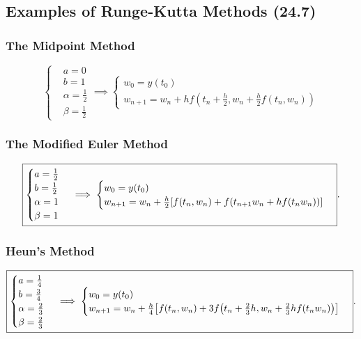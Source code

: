 \documentclass[12pt]{article}
\begin{document}
\subsection{Examples of Runge-Kutta Methods (24.7)}
\subsubsection{The Midpoint Method}
\begin{equation*}
  \boxed{\begin{cases}
     & a = 0\\
     & b=1\\
     & \alpha = \frac{1}{2}\\
     & \beta = \frac{1}{2}
    \end{cases}
    \implies 
    \begin{cases}
      w_0 = y(t_0) \\
      w_{n+1} = w_n + h f(t_n + \frac{h}{2}, w_n + \frac{h}{2}f(t_n, w_n)) 
  \end{cases}}
\end{equation*}
\subsubsection{The Modified Euler Method}
\begin{equation*}
  \boxed{\begin{cases}
      a = \frac{1}{2} \\
      b = \frac{1}{2} \\
      \alpha = 1 \\
      \beta = 1
    \end{cases}
    \implies 
    \begin{cases}
      w_0 = y(t_0) \\
      w_{n+1} = w_n + \frac{h}{2} \bqty{f(t_n,w_n)+f\pqty{t_{n+1}w_n+hf(t_nw_n)}}
  \end{cases}}
.\end{equation*}

\subsubsection{Heun's Method}
\begin{equation*}
  \boxed{\begin{cases}
      a = \frac{1}{4} \\
      b = \frac{3}{4} \\
      \alpha = \frac{2}{3} \\
      \beta = \frac{2}{3}
    \end{cases}
    \implies 
    \begin{cases}
      w_0 = y(t_0) \\
      w_{n+1} = w_n + \frac{h}{4} \bqty{f(t_n,w_n)+3f\pqty{t_n+\frac{2}{3}h,
      w_n+\frac{2}{3}hf(t_nw_n)}}
  \end{cases}}
.\end{equation*}
\end{document}
